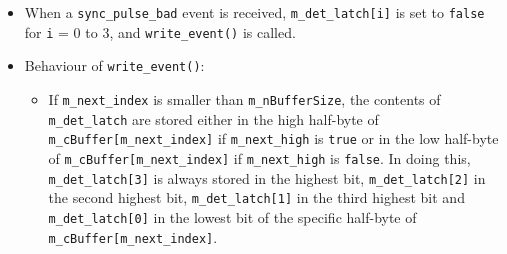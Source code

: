 \begin{itemize}
\begin{enumerate}
\end{enumerate}

\item When a \texttt{sync\_pulse\_bad} event is received, \texttt{m\_det\_latch[i]} is set to \texttt{false} for \texttt{i} = 0 to 3, and \texttt{write\_event()} is called.

\item Behaviour of \texttt{write\_event()}:

\begin{itemize}

\item If \texttt{m\_next\_index} is smaller than \texttt{m\_nBufferSize}, the contents of \texttt{m\_det\_latch} are stored either in the high half-byte of \texttt{m\_cBuffer[m\_next\_index]} if \texttt{m\_next\_high} is \texttt{true} or in the low half-byte of \texttt{m\_cBuffer[m\_next\_index]} if \texttt{m\_next\_high} is \texttt{false}. In doing this, \texttt{m\_det\_latch[3]} is always stored in the highest bit, \texttt{m\_det\_latch[2]} in the second highest bit, \texttt{m\_det\_latch[1]} in the third highest bit and \texttt{m\_det\_latch[0]} in the lowest bit of the specific half-byte of \texttt{m\_cBuffer[m\_next\_index]}.

\end{itemize}

\end{itemize}

